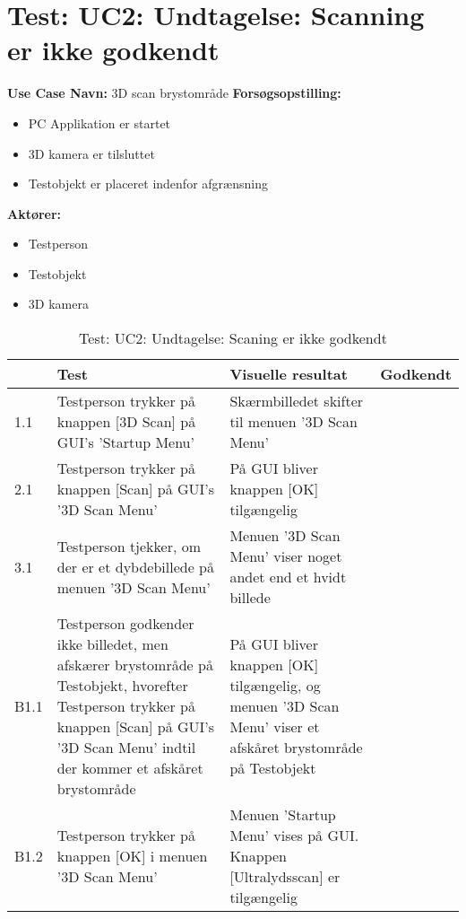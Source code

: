 \section{Test: UC2: Undtagelse: Scanning er ikke godkendt}
\textbf{Use Case Navn:} 3D scan brystområde \newline
\textbf{Forsøgsopstilling:}
\begin{itemize}
\item PC Applikation er startet
\item 3D kamera er tilsluttet
\item Testobjekt er placeret indenfor afgrænsning 
\end{itemize}  
\textbf{Aktører:}
\begin{itemize}
\item Testperson
\item Testobjekt
\item 3D kamera
\end{itemize}  

\begin{table}[htb]
\begin{tabularx}{\textwidth}{|p{0.7cm}|X|X|p{2cm}|}
\hline
\textbf{} & \textbf{Test} & \textbf{Visuelle resultat} &\textbf{Godkendt} \\\hline
1.1 & Testperson trykker på knappen [3D Scan] på GUI's 'Startup Menu' & Skærmbilledet skifter til menuen '3D Scan Menu' &  \\\hline
2.1 & Testperson trykker på knappen [Scan] på GUI's '3D Scan Menu' & På GUI bliver knappen [OK] tilgængelig &  \\\hline
3.1 & Testperson tjekker, om der er et dybdebillede på menuen '3D Scan Menu' & Menuen '3D Scan Menu' viser noget andet end et hvidt billede & \\\hline
B1.1 & Testperson godkender ikke billedet, men afskærer brystområde på Testobjekt, hvorefter Testperson trykker på knappen [Scan] på GUI's '3D Scan Menu' indtil der kommer et afskåret brystområde & På GUI bliver knappen [OK] tilgængelig, og menuen '3D Scan Menu' viser et afskåret brystområde på Testobjekt & \\\hline 
B1.2 & Testperson trykker på knappen [OK] i menuen '3D Scan Menu' & Menuen 'Startup Menu' vises på GUI. Knappen [Ultralydsscan] er tilgængelig & \\\hline
\end{tabularx}
    \caption{Test: UC2: Undtagelse: Scaning er ikke godkendt}
    \label{uc2_test_e_2_label}  
\end{table}
\newpage


